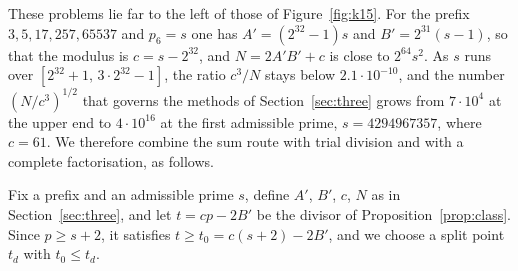 \documentclass[screen,reqno]{aomart}
\numberwithin{equation}{section}
\theoremstyle{plain}
\theoremstyle{definition}
\theoremstyle{remark}
\begin{document}
These problems lie far to the left of those of Figure~\ref{fig:k15}.
For the prefix $3,5,17,257,65537$ and $p_6=s$ one has
$A'=(2^{32}-1)s$ and $B'=2^{31}(s-1)$, so that the modulus is
$c=s-2^{32}$, and $N=2A'B'+c$ is close to $2^{64}s^2$. As $s$ runs
over $[2^{32}+1,\,3\cdot2^{32}-1]$, the ratio $c^3/N$ stays below
$2.1\cdot10^{-10}$, and the number $(N/c^3)^{1/2}$ that governs the
methods of Section~\ref{sec:three} grows from $7\cdot10^4$ at the
upper end to $4\cdot10^{16}$ at the first admissible prime,
$s=4294967357$, where $c=61$. We therefore combine the sum route with
trial division and with a complete factorisation, as follows.

Fix a prefix and an admissible prime $s$, define $A'$, $B'$, $c$, $N$
as in Section~\ref{sec:three}, and let $t=cp-2B'$ be the divisor of
Proposition~\ref{prop:class}. Since $p\ge s+2$, it satisfies
$t\ge t_0=c(s+2)-2B'$, and we choose a split point $t_d$ with
$t_0\le t_d$.
\end{document}
